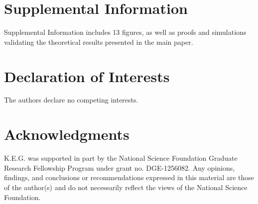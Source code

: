 \documentclass[12pt]{article}
\begin{document}



\newpage

\section{Supplemental Information}


Supplemental Information includes 13 figures, as well as proofs and simulations validating the theoretical results presented in the main paper.


\section{Declaration of Interests}


The authors declare no competing interests.


\section{Acknowledgments}


K.E.G. was supported in part by the National Science Foundation Graduate Research Fellowship Program under grant no. DGE-1256082. Any opinions, findings, and conclusions or recommendations expressed in this material are those of the author(s) and do not necessarily reflect the views of the National Science Foundation.
\end{document}
